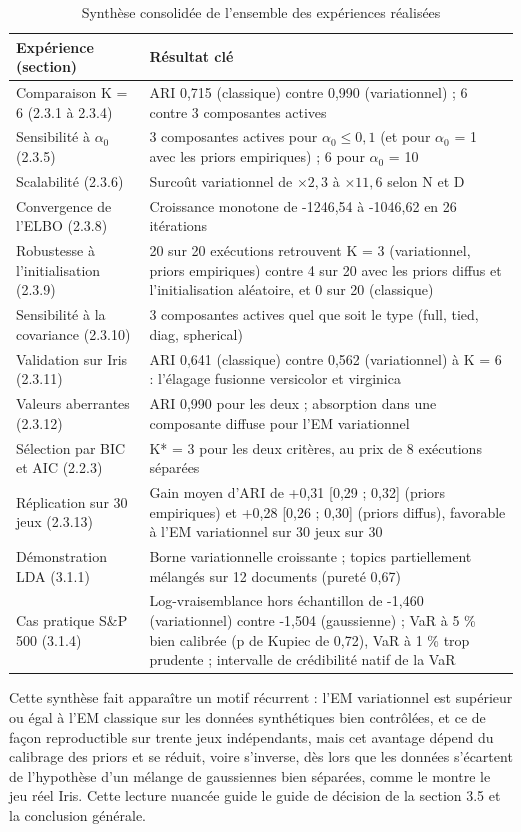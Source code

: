 \begin{table}[H]
\centering
\small
\setlength{\tabcolsep}{0.14cm}
\begin{tabular}{|p{5.2cm}|p{9.6cm}|}
\hline
\textbf{Expérience (section)} & \textbf{Résultat clé} \\
\hline
Comparaison K = 6 (2.3.1 à 2.3.4) & ARI 0,715 (classique) contre 0,990 (variationnel) ; 6 contre 3 composantes actives \\
\hline
Sensibilité à $\alpha _{0}$ (2.3.5) & 3 composantes actives pour $\alpha _{0} \leq 0{,}1$ (et pour $\alpha _{0}$ = 1 avec les priors empiriques) ; 6 pour $\alpha _{0}$ = 10 \\
\hline
Scalabilité (2.3.6) & Surcoût variationnel de $\times 2,3$ à $\times 11,6$ selon N et D \\
\hline
Convergence de l'ELBO (2.3.8) & Croissance monotone de -1246,54 à -1046,62 en 26 itérations \\
\hline
Robustesse à l'initialisation (2.3.9) & 20 sur 20 exécutions retrouvent K = 3 (variationnel, priors empiriques) contre 4 sur 20 avec les priors diffus et l'initialisation aléatoire, et 0 sur 20 (classique) \\
\hline
Sensibilité à la covariance (2.3.10) & 3 composantes actives quel que soit le type (full, tied, diag, spherical) \\
\hline
Validation sur Iris (2.3.11) & ARI 0,641 (classique) contre 0,562 (variationnel) à K = 6 : l'élagage fusionne versicolor et virginica \\
\hline
Valeurs aberrantes (2.3.12) & ARI 0,990 pour les deux ; absorption dans une composante diffuse pour l'EM variationnel \\
\hline
Sélection par BIC et AIC (2.2.3) & K* = 3 pour les deux critères, au prix de 8 exécutions séparées \\
\hline
Réplication sur 30 jeux (2.3.13) & Gain moyen d'ARI de +0,31 [0,29 ; 0,32] (priors empiriques) et +0,28 [0,26 ; 0,30] (priors diffus), favorable à l'EM variationnel sur 30 jeux sur 30 \\
\hline
Démonstration LDA (3.1.1) & Borne variationnelle croissante ; topics partiellement mélangés sur 12 documents (pureté 0,67) \\
\hline
Cas pratique S\&P 500 (3.1.4) & Log-vraisemblance hors échantillon de -1,460 (variationnel) contre -1,504 (gaussienne) ; VaR à 5 \% bien calibrée (p de Kupiec de 0,72), VaR à 1 \% trop prudente ; intervalle de crédibilité natif de la VaR \\
\hline
\end{tabular}
\caption{Synthèse consolidée de l'ensemble des expériences réalisées}
\label{tab:3_3}
\end{table}
Cette synthèse fait apparaître un motif récurrent : l'EM variationnel est supérieur ou égal à l'EM classique sur les données synthétiques bien contrôlées, et ce de façon reproductible sur trente jeux indépendants, mais cet avantage dépend du calibrage des priors et se réduit, voire s'inverse, dès lors que les données s'écartent de l'hypothèse d'un mélange de gaussiennes bien séparées, comme le montre le jeu réel Iris. Cette lecture nuancée guide le guide de décision de la section 3.5 et la conclusion générale.

